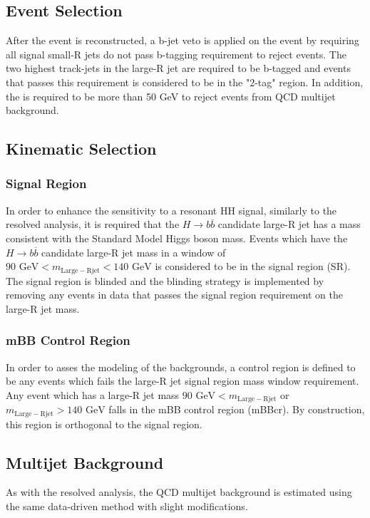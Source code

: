 \subsection{Event Selection}
\label{sec:boosted_selection}
After the event is reconstructed, a b-jet veto is applied on the event by requiring all signal small-R jets do not pass b-tagging requirement to reject \ttbar events. The two highest \pT track-jets in the large-R jet are required to be b-tagged and events that passes this requirement is considered to be in the "2-tag" region. In addition, the \met{} is required to be more than 50 GeV to reject events from QCD multijet background.%

\subsection{Kinematic Selection}
\subsubsection{Signal Region}
\label{sec:boosted_regiondefs}
In order to enhance the sensitivity to a resonant HH signal, similarly to the resolved analysis, it is required
that the ${H\rightarrow b\overline{b}}$ candidate large-R jet has a mass consistent with the Standard Model Higgs boson mass.
Events which have the ${H\rightarrow b\overline{b}}$ candidate large-R jet mass in a window of ${90 \text{ GeV} < m_{\mathrm{Large-R jet}} < 140 \text{ GeV}}$ is considered to be in the signal region (SR).
The signal region is blinded and the blinding strategy is implemented by removing any events in data that passes the signal region requirement on the large-R jet mass.

\subsubsection{mBB Control Region}
In order to asses the modeling of the backgrounds, a control region is defined to be any events which fails the large-R jet signal region mass window requirement. Any event which has a large-R jet mass
 ${90 \text{ GeV} < m_{\mathrm{Large-R jet}}}$
 or ${m_{\mathrm{Large-R jet}} > 140 \text{ GeV}}$ 
 falls in the mBB control region (mBBcr). By construction, this region is orthogonal to the signal region.

\subsection{Multijet Background}
As with the resolved analysis, the QCD multijet background is estimated using the same data-driven method with slight modifications. 
 
